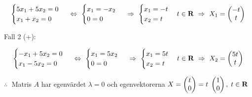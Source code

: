 \documentclass{article}
\begin{document}
\begin{enumerate}
        $$ 
        \begin{cases}
            5x_{1}+5x_{2}=0 \\
            x_{1}+x_{2}=0
        \end{cases}
        \ \Leftrightarrow \ 
        \begin{cases}
            x_{1}=-x_{2} \\
            0=0
        \end{cases}
        \ \Rightarrow \ 
        \begin{cases}
            x_{1}=-t \\
            x_{2}=t
        \end{cases}
        t\in\mathbf{R}
        \ \Rightarrow \ 
        X_{1}=
        \begin{pmatrix}
            -t \\
            t
        \end{pmatrix}
        $$

        \vskip 0.2cm

        Fall 2 (+):

        \vskip -0.2cm

        $$
        \begin{cases}
            -x_{1}+5x_{2}=0 \\
            x_{1}-5x_{2}=0
        \end{cases}
        \ \Leftrightarrow \ 
        \begin{cases}
            x_{1}=5x_{2} \\
            0=0
        \end{cases}
        \ \Rightarrow \ 
        \begin{cases}
            x_{1}=5t \\
            x_{2}=t
        \end{cases}
        t\in\mathbf{R}
        \ \Rightarrow \ 
        X_{2}=
        \begin{pmatrix}
            5t \\
            t
        \end{pmatrix}
        $$

        \vskip 0.5cm

        $\therefore \;$ Matris $A$ har egenvärdet $\lambda=0$ och egenvektorerna $X=\begin{pmatrix} t \\ 0 \end{pmatrix}=t \; \begin{pmatrix} 1 \\ 0 \end{pmatrix}, \; t\in\mathbf{R}$


\end{enumerate}
\end{document}
